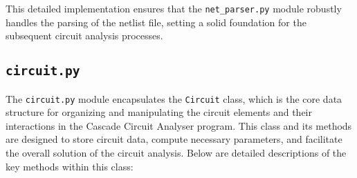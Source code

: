 \documentclass[conference]{IEEEtran}
\begin{document}
This detailed implementation ensures that the \texttt{net\_parser.py} module robustly handles the parsing of the netlist
file, setting a solid foundation for the subsequent circuit analysis processes.
\subsection{\textbf{\texttt{circuit.py}}}
The \texttt{circuit.py} module encapsulates the \texttt{Circuit} class, which is the core data structure for organizing
and manipulating the circuit elements and their interactions in the Cascade Circuit Analyser program. This class and its
methods are designed to store circuit data, compute necessary parameters, and facilitate the overall solution of the circuit
analysis. Below are detailed descriptions of the key methods within this class:
\end{document}
